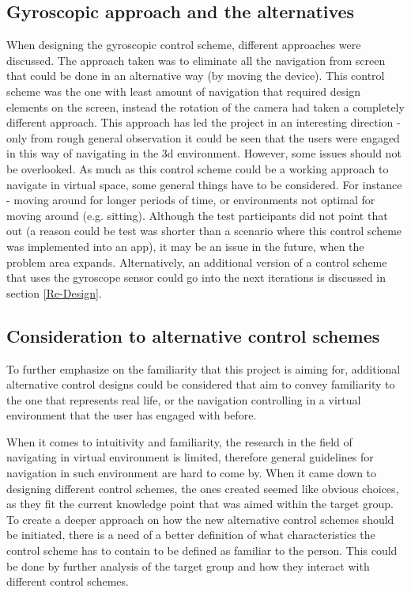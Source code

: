 \subsection*{Gyroscopic approach and the alternatives}
When designing the gyroscopic control scheme, different approaches were discussed. The approach taken was to eliminate all the navigation from screen that could be done in an alternative way (by moving the device). This control scheme was the one with least amount of navigation that required design elements on the screen, instead the rotation of the camera had taken a completely different approach. This approach has led the project in an interesting direction - only from rough general observation it could be seen that the users were engaged in this way of navigating in the 3d environment.
However, some issues should not be overlooked. As much as this control scheme could be a working approach to navigate in virtual space, some general things have to be considered. For instance - moving around for longer periods of time, or environments not optimal for moving around (e.g. sitting). Although the test participants did not point that out (a reason could be test was shorter than a scenario where this control scheme was implemented into an app), it may be an issue in the future, when the problem area expands.
Alternatively, an additional version of a control scheme that uses the gyroscope sensor could go into the next iterations is discussed in section \ref{Re-Design}.


\subsection*{Consideration to alternative control schemes}
To further emphasize on the familiarity that this project is aiming for, additional alternative control designs could be considered that aim to convey familiarity to the one that represents real life, or the navigation controlling in a virtual environment that the user has engaged with before.

When it comes to intuitivity and familiarity, the research in the field of navigating in virtual environment is limited, therefore general guidelines for navigation in such environment are hard to come by. When it came down to designing different control schemes, the ones created seemed like obvious choices, as they fit the current knowledge point that was aimed within the target group. To create a deeper approach on how the new alternative control schemes should be initiated, there is a need of a better definition of what characteristics the control scheme has to contain to be defined as familiar to the person. This could be done by further analysis of the target group and how they interact with different control schemes.

